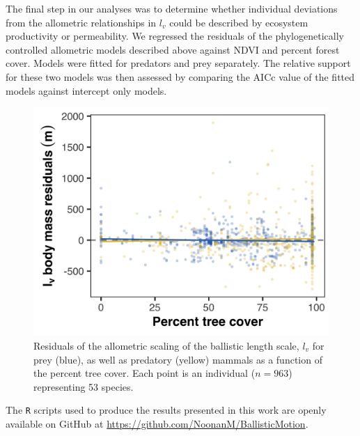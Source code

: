 \documentclass[12pt]{article}
\begin{document}


The final step in our analyses was to determine whether individual deviations from the allometric relationships in $l_v$ could be described by ecosystem productivity or permeability. We regressed the residuals of the phylogenetically controlled allometric models described above against NDVI and percent forest cover. Models were fitted for predators and prey separately. The relative support for these two models was then assessed by comparing the AICc value of the fitted models against intercept only models.



\begin{figure}[!h]
\centering
\includegraphics[scale=1]{Empirical_Figure_Trees.png}
\caption{Residuals of the allometric scaling of the ballistic length scale, $l_v$  for prey (blue), as well as predatory (yellow) mammals as a function of the percent tree cover. Each point is an individual ($n=963$) representing 53 species.}
\label{fig:Trees}
\end{figure}

The \texttt{R} scripts used to produce the results presented in this work are openly available on GitHub at \url{https://github.com/NoonanM/BallisticMotion}.


\end{document}
